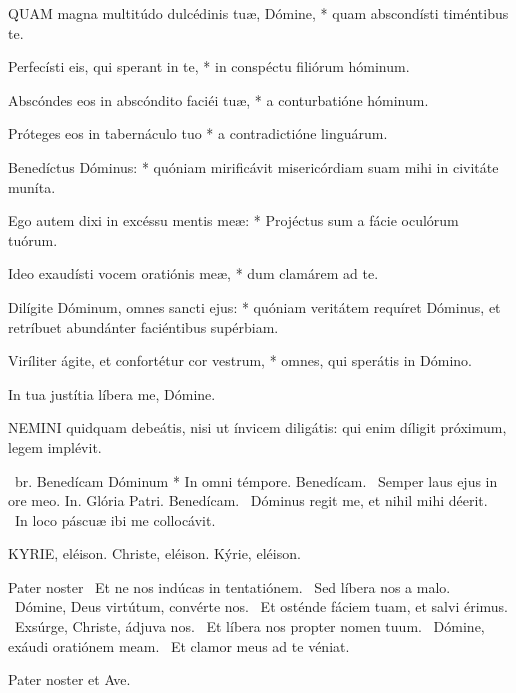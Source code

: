 
\lettrine[lines=2]{Q}{UAM} magna multitúdo dulcédinis tuæ, Dómine, * quam abscondísti timéntibus te.

Perfecísti eis, qui sperant in te, * in conspéctu filiórum hóminum.

Abscóndes eos in abscóndito faciéi tuæ, * a conturbatióne hóminum.

Próteges eos in tabernáculo tuo * a contradictióne linguárum.

Benedíctus Dóminus: * quóniam mirificávit misericórdiam suam mihi in civitáte muníta.

Ego autem dixi in excéssu mentis meæ: * Projéctus sum a fácie oculórum tuórum.

Ideo exaudísti vocem oratiónis meæ, * dum clamárem ad te.

Dilígite Dóminum, omnes sancti ejus: * quóniam veritátem requíret Dóminus, et retríbuet abundánter faciéntibus supérbiam.

Viríliter ágite, et confortétur cor vestrum, * omnes, qui sperátis in Dómino.

 In tua justítia líbera me, Dómine.



\lettrine[lines=2]{N}{EMINI} quidquam debeátis, nisi ut ínvicem diligátis: qui enim díligit próximum, legem implévit.

\R\ br. Benedícam Dóminum * In omni témpore. Benedícam. \V\ Semper laus ejus in ore meo. In. Glória Patri. Benedícam. \V\ Dóminus regit me, et nihil mihi déerit. \R\ In loco páscuæ ibi me collocávit.



KYRIE, eléison. Christe, eléison. Kýrie, eléison.

Pater noster  \V\ Et ne nos indúcas in tentatiónem. \R\ Sed líbera nos a malo. \V\ Dómine, Deus virtútum, convérte nos. \R\ Et osténde fáciem tuam, et salvi érimus. \V\ Exsúrge, Christe, ádjuva nos. \R\ Et líbera nos propter nomen tuum. \V\ Dómine, exáudi oratiónem meam. \R\ Et clamor meus ad te véniat.



Pater noster et Ave.

